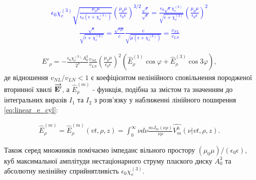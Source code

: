 \textcolor{blue} { \begin{equation*} \begin{aligned}
\epsilon_0 \chi_e^{(3)}
\sqrt{\frac{\mu_0 \mu}{\epsilon_0 \left( \epsilon + \chi_e^{(3)} \right)}} 
\left( \frac{\mu_0 \mu}{\epsilon_0 \epsilon} \right)^{3/2} 
\frac{\sqrt{\epsilon}}{\sqrt{\epsilon}} =
\frac{\epsilon_0 \sqrt{\epsilon} \chi_e^{(3)}}
{\sqrt{\epsilon + \chi_e^{(3)}}} 
\left( \frac{\mu_0 \mu}{\epsilon_0 \epsilon} \right)^2
\end{aligned} \end{equation*} }
%
\textcolor{blue} { \begin{equation*} \begin{aligned}
\frac{\sqrt{\epsilon}}
{\sqrt{\epsilon + \chi_e^{(3)}}} =
\frac{\sqrt{\epsilon \mu}}{c} 
\frac{c}{\sqrt{\mu \left( \epsilon + \chi_e^{(3)} \right)}} = 
\frac{v_{NL}}{v_{LN}}
\end{aligned} \end{equation*} }

\begin{equation} \begin{aligned} \label{eq:erho_kerr}
E'_\rho = - \frac{\epsilon_0 \chi_e^{(3)} A_0^3}{2^7}
\frac{v_{NL}}{v_{LN}}
\left( \frac{\mu_0 \mu}{\epsilon_0 \epsilon} \right)^2
\left(\hat{E}_\rho^{(1)} \cos \varphi +
\hat{E}_\rho^{(3)} \cos 3 \varphi \right),
\end{aligned} \end{equation}
%
де відношення $ v_{NL} / v_{LN} < 1 $ є коефіцієнтом нелінійного 
сповільнення породженої вторинної хвилі $ \overrightarrow{\mathbf E'} $, а 
$ \hat{E}_\rho^{(m)} $ - функція, подібна за змістом та значенням до 
інтегральних виразів $ I_1 $ та $ I_2 $ з розв'язку у наближенні
лінійного поширення \eqref{eq:linear_e_cyl}:

\begin{equation} \begin{aligned} \label{eq:erho_norm}
\hat{E}_\rho^{(m)} = \hat{E}_\rho^{(m)} (vt,\rho,z) = 
\int_0^\infty \nu d \nu \frac{m J_m(\nu \rho)}{\nu \rho} 
\hat{V_m^h} (\nu | vt,\rho,z).
\end{aligned} \end{equation}

Також серед множників помічаємо імпеданс вільного простору 
$ (\mu_0 \mu) / (\epsilon_0 \epsilon) $, куб максимальної амплітуди 
нестаціонарного струму плаского диску $ A_0^3 $ та абсолютну нелінійну 
сприйнятливість $ \epsilon_0 \chi_e^{(3)} $.

